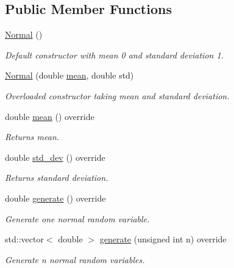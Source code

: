 \subsection*{Public Member Functions}
\begin{DoxyCompactItemize}
\item 
\mbox{\label{classNormal_af62e51ec40dc2eedc3b9ca49ebdc7197}} 
\hyperlink{classNormal_af62e51ec40dc2eedc3b9ca49ebdc7197}{Normal} ()
\begin{DoxyCompactList}\small\item\em Default constructor with mean 0 and standard deviation 1. \end{DoxyCompactList}\item 
\mbox{\label{classNormal_aa1c65330d29f9d34a3c35e01371a5a0c}} 
\hyperlink{classNormal_aa1c65330d29f9d34a3c35e01371a5a0c}{Normal} (double \hyperlink{classNormal_a5dc39c228fb8dd3d1ce4c0cb1dcf7b76}{mean}, double std)
\begin{DoxyCompactList}\small\item\em Overloaded constructor taking mean and standard deviation. \end{DoxyCompactList}\item 
\mbox{\label{classNormal_a5dc39c228fb8dd3d1ce4c0cb1dcf7b76}} 
double \hyperlink{classNormal_a5dc39c228fb8dd3d1ce4c0cb1dcf7b76}{mean} () override
\begin{DoxyCompactList}\small\item\em Returns mean. \end{DoxyCompactList}\item 
\mbox{\label{classNormal_a7f589b40a55eaa34cec17bd31c42e249}} 
double \hyperlink{classNormal_a7f589b40a55eaa34cec17bd31c42e249}{std\+\_\+dev} () override
\begin{DoxyCompactList}\small\item\em Returns standard deviation. \end{DoxyCompactList}\item 
\mbox{\label{classNormal_ace26d5def9f3a3fb469408a4f38ad37d}} 
double \hyperlink{classNormal_ace26d5def9f3a3fb469408a4f38ad37d}{generate} () override
\begin{DoxyCompactList}\small\item\em Generate one normal random variable. \end{DoxyCompactList}\item 
\mbox{\label{classNormal_ab789b8edd1b382eb3d3e05bd9199996f}} 
std\+::vector$<$ double $>$ \hyperlink{classNormal_ab789b8edd1b382eb3d3e05bd9199996f}{generate} (unsigned int n) override
\begin{DoxyCompactList}\small\item\em Generate n normal random variables. \end{DoxyCompactList}\end{DoxyCompactItemize}


